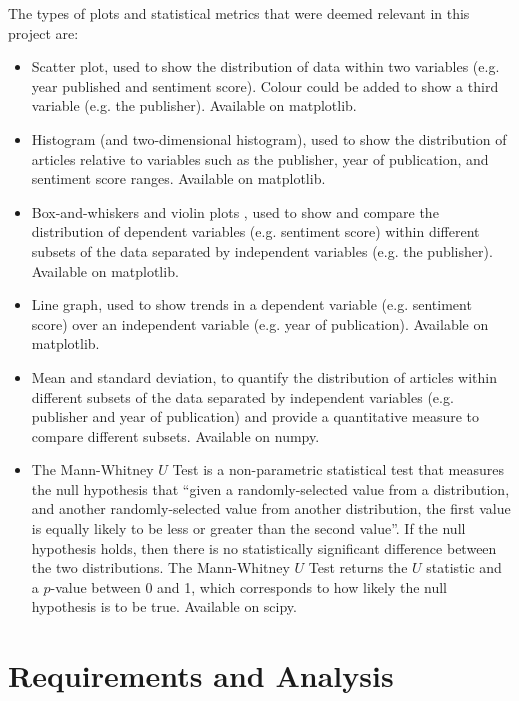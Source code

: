 \documentclass{report}
\begin{document}
The types of plots and statistical metrics that were deemed relevant in this project are:
\begin{itemize}
	\item Scatter plot, used to show the distribution of data within two variables (e.g. year published and sentiment score). 
		Colour could be added to show a third variable (e.g. the publisher).
		Available on matplotlib.
	\item Histogram (and two-dimensional histogram), used to show the distribution of articles relative to variables such as the publisher, year of publication, and sentiment score ranges. 
		Available on matplotlib.
	\item Box-and-whiskers \cite{tukey1977exploratory} and violin plots \cite{hintze1998violin}, used to show and compare the distribution of dependent variables (e.g. sentiment score) within different subsets of the data separated by independent variables (e.g. the publisher).
		Available on matplotlib.
	\item Line graph, used to show trends in a dependent variable (e.g. sentiment score) over an independent variable (e.g. year of publication).
		Available on matplotlib.
	\item Mean and standard deviation, to quantify the distribution of articles within different subsets of the data separated by independent variables (e.g. publisher and year of publication) and provide a quantitative measure to compare different subsets.
		Available on numpy.
	\item The Mann-Whitney $U$ Test \cite{mann1947test} is a non-parametric statistical test that measures the null hypothesis that ``given a randomly-selected value from a distribution, and another randomly-selected value from another distribution, the first value is equally likely to be less or greater than the second value''.
		If the null hypothesis holds, then there is no statistically significant difference between the two distributions.
		The Mann-Whitney $U$ Test returns the $U$ statistic and a $p$-value between 0 and 1, which corresponds to how likely the null hypothesis is to be true.
		Available on scipy.
\end{itemize}

\chapter{Requirements and Analysis} \label{Requirements and Analysis}  %

\end{document}
